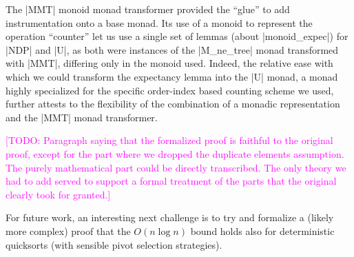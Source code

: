 \documentclass[runningheads]{llncs}
\newcommand{\todo}[1]{\textcolor{magenta}{[TODO: #1]}}
\begin{document}
The |MMT| monoid monad transformer provided the ``glue'' to add instrumentation onto a base monad. Its use of a monoid to represent the operation ``counter'' let us use a single set of lemmas (about |monoid_expec|) for |NDP| and |U|, as both were instances of the |M_ne_tree| monad transformed with |MMT|, differing only in the monoid used. Indeed, the relative ease with which we could transform the expectancy lemma into the |U| monad, a monad highly specialized for the specific order-index based counting scheme we used, further attests to the flexibility of the combination of a monadic representation and the |MMT| monad transformer.

\todo{Paragraph saying that the formalized proof is faithful to the original proof, except for the part where we dropped the duplicate elements assumption. The purely mathematical part could be directly transcribed. The only theory we had to add served to support a formal treatment of the parts that the original clearly took for granted.}


For future work, an interesting next challenge is to try and formalize a (likely more complex) proof that the $O(n \log n)$ bound holds also for deterministic quicksorts (with sensible pivot selection strategies).



\end{document}
